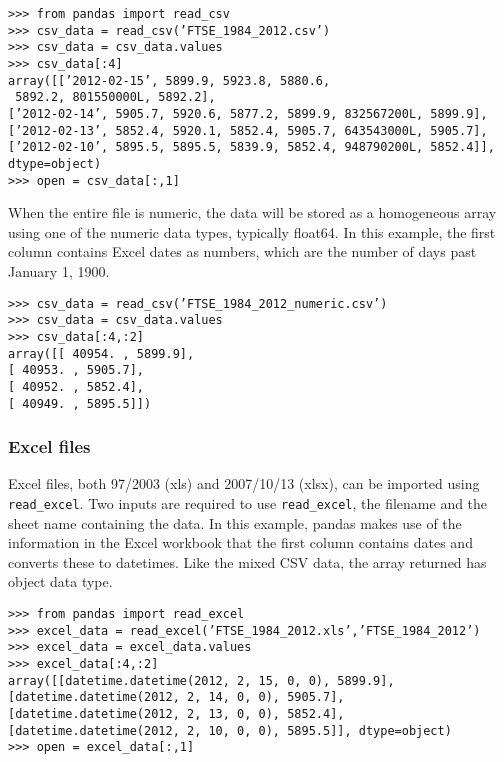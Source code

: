 \documentclass[KSmain.tex]{subfiles}
\begin{document}
\begin{framed}
\begin{verbatim}
>>> from pandas import read_csv
>>> csv_data = read_csv(’FTSE_1984_2012.csv’)
>>> csv_data = csv_data.values
>>> csv_data[:4]
array([[’2012-02-15’, 5899.9, 5923.8, 5880.6, 
 5892.2, 801550000L, 5892.2],
[’2012-02-14’, 5905.7, 5920.6, 5877.2, 5899.9, 832567200L, 5899.9],
[’2012-02-13’, 5852.4, 5920.1, 5852.4, 5905.7, 643543000L, 5905.7],
[’2012-02-10’, 5895.5, 5895.5, 5839.9, 5852.4, 948790200L, 5852.4]], 
dtype=object)
>>> open = csv_data[:,1]
\end{verbatim}
\end{framed}

When the entire file is numeric, the data will be stored as a homogeneous array using one of the numeric
data types, typically float64. In this example, the first column contains Excel dates as numbers, which are
the number of days past January 1, 1900.
\begin{framed}
	\begin{verbatim}
>>> csv_data = read_csv(’FTSE_1984_2012_numeric.csv’)
>>> csv_data = csv_data.values
>>> csv_data[:4,:2]
array([[ 40954. , 5899.9],
[ 40953. , 5905.7],
[ 40952. , 5852.4],
[ 40949. , 5895.5]])
\end{verbatim}
\end{framed}
\subsubsection{Excel files}
Excel files, both 97/2003 (xls) and 2007/10/13 (xlsx), can be imported using \texttt{read\_excel}. Two inputs are
required to use \texttt{read\_excel}, the filename and the sheet name containing the data. In this example, pandas
makes use of the information in the Excel workbook that the first column contains dates and converts
these to datetimes. Like the mixed CSV data, the array returned has object data type.
\begin{framed}
\begin{verbatim}
>>> from pandas import read_excel
>>> excel_data = read_excel(’FTSE_1984_2012.xls’,’FTSE_1984_2012’)
>>> excel_data = excel_data.values
>>> excel_data[:4,:2]
array([[datetime.datetime(2012, 2, 15, 0, 0), 5899.9],
[datetime.datetime(2012, 2, 14, 0, 0), 5905.7],
[datetime.datetime(2012, 2, 13, 0, 0), 5852.4],
[datetime.datetime(2012, 2, 10, 0, 0), 5895.5]], dtype=object)
>>> open = excel_data[:,1]
\end{verbatim}
\end{framed}
\newpage
\end{document}
